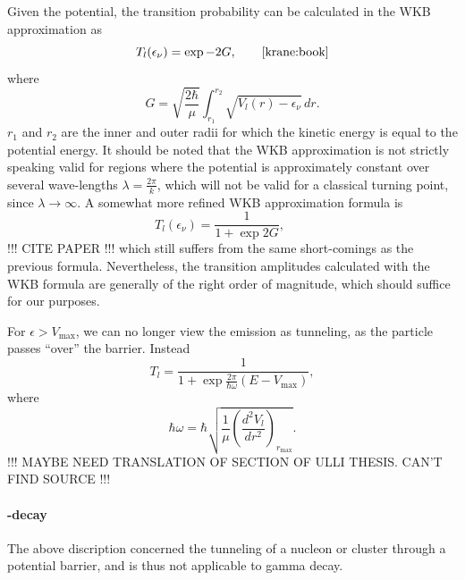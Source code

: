 Given the potential, the transition probability can be calculated in the WKB approximation as 
\begin{equation}
T_l(\epsilon_\nu) = \exp{-2G},\qquad\cite{krane:book}
\end{equation}
where 
\begin{equation}
G=\sqrt{\frac{2\hbar}{\mu}} \int_{r_1}^{r_2} \sqrt{V_l(r)-\epsilon_{\nu}}\,dr.
\end{equation}
$r_1$ and $r_2$ are the inner and outer radii for which the kinetic energy is equal to the potential energy. It should be noted that the WKB approximation is not strictly speaking valid for regions where the potential is approximately constant over several wave-lengths $\lambda=\frac{2\pi}{k}$, which will not be valid for a classical turning point, since $\lambda \to \infty$. 
A somewhat more refined WKB approximation formula is
\begin{equation}
T_l(\epsilon_\nu) = \frac{1}{1+\exp{2G}},\qquad
\end{equation}
!!! CITE PAPER !!! which still suffers from the same short-comings as the previous formula. Nevertheless, the transition amplitudes calculated with the WKB formula are generally of the right order of magnitude, which should suffice for our purposes\cite{2011arXiv1106.1065N}.

For $\epsilon>V_\text{max}$, we can no longer view the emission as tunneling, as the particle passes ``over'' the barrier. Instead
\begin{equation}
T_l = \frac{1}{1+\exp{\frac{2\pi}{\hbar \omega}(E-V_\text{max})}},
\end{equation}
where
\begin{equation}
\hbar\omega = \hbar\sqrt{\frac{1}{\mu}\left(\frac{d^2V_l}{dr^2}\right)_{r_\text{max}}}.
\end{equation}
!!! MAYBE NEED TRANSLATION OF SECTION OF ULLI THESIS. CAN'T FIND SOURCE !!!

\paragraph{\gamma-decay}
The above discription concerned the tunneling of a nucleon or cluster through a potential barrier, and is thus not applicable to gamma decay.

